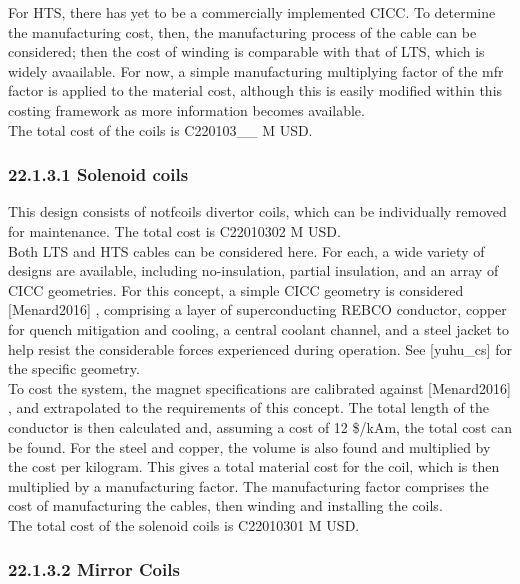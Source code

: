 For HTS, there has yet to be a commercially implemented CICC. To determine the manufacturing cost, then, the manufacturing process of the cable can be considered; then the cost of winding is comparable with that of LTS, which is widely avaailable. For now, a simple manufacturing multiplying factor of the mfr factor is applied to the material cost, although this is easily modified within this costing framework as more information becomes available.\\

The total cost of the coils is C220103__ M USD.


\subsubsection*{22.1.3.1 Solenoid coils}

This design consists of notfcoils divertor coils, which can be individually removed for maintenance. The total cost is C22010302 M USD.\\

Both LTS and HTS cables can be considered here. For each, a wide variety of designs are available, including no-insulation, partial insulation, and an array of CICC geometries. For this concept, a simple CICC geometry is considered [Menard2016]
, comprising a layer of superconducting REBCO conductor, copper for quench mitigation and cooling, a central coolant channel, and a steel jacket to help resist the considerable forces experienced during operation. See [yuhu\_cs]
for the specific geometry.\\

To cost the system, the magnet specifications are calibrated against [Menard2016]
, and extrapolated to the requirements of this concept. The total length of the conductor is then calculated and, assuming a cost of 12 \$/kAm, the total cost can be found. For the steel and copper, the volume is also found and multiplied by the cost per kilogram. This gives a total material cost for the coil, which is then multiplied by a manufacturing factor. The manufacturing factor comprises the cost of manufacturing the cables, then winding and installing the coils. \\

The total cost of the solenoid coils is C22010301 M USD.


\subsubsection*{22.1.3.2 Mirror Coils}

